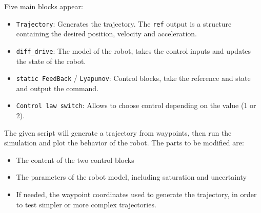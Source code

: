 \documentclass{ecnreport}
\begin{document}
\newpage

Five main blocks appear:
\begin{itemize}
 \item \texttt{Trajectory}: Generates the trajectory. The \texttt{ref} output is a structure containing the desired position, velocity and acceleration.
 \item \texttt{diff\_drive}: The model of the robot, takes the control inputs and updates the state of the robot.
 \item \texttt{static FeedBack} / \texttt{Lyapunov}: Control blocks, take the reference and state and output the command.
 \item \texttt{Control law switch}: Allows to choose control depending on the value (1 or 2).
\end{itemize}

The given script will generate a trajectory from waypoints, then run the simulation and plot the behavior of the robot. The parts to be modified are:
\begin{itemize}
 \item The content of the two control blocks
 \item The parameters of the robot model, including saturation and uncertainty
 \item If needed, the waypoint coordinates used to generate the trajectory, in order to test simpler or more complex trajectories.
\end{itemize}
\end{document}
